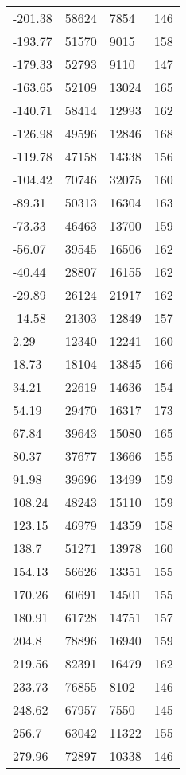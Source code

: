 \documentclass[11pt,wide]{mwart}
\begin{document}
\begin{longtable}{|l|l|l|l|}
        -201.38 & 58624 & 7854 & 146 \\
        -193.77 & 51570 & 9015 & 158 \\
        -179.33 & 52793 & 9110 & 147 \\
        -163.65 & 52109 & 13024 & 165 \\
        -140.71 & 58414 & 12993 & 162 \\
        -126.98 & 49596 & 12846 & 168 \\
        -119.78 & 47158 & 14338 & 156 \\
        -104.42 & 70746 & 32075 & 160 \\
         -89.31 & 50313 & 16304 & 163 \\
         -73.33 & 46463 & 13700 & 159 \\
         -56.07 & 39545 & 16506 & 162 \\
         -40.44 & 28807 & 16155 & 162 \\
         -29.89 & 26124 & 21917 & 162 \\
         -14.58 & 21303 & 12849 & 157 \\
           2.29 & 12340 & 12241 & 160 \\
          18.73 & 18104 & 13845 & 166 \\
          34.21 & 22619 & 14636 & 154 \\
          54.19 & 29470 & 16317 & 173 \\
          67.84 & 39643 & 15080 & 165 \\
          80.37 & 37677 & 13666 & 155 \\
          91.98 & 39696 & 13499 & 159 \\
         108.24 & 48243 & 15110 & 159 \\
         123.15 & 46979 & 14359 & 158 \\
          138.7 & 51271 & 13978 & 160 \\
         154.13 & 56626 & 13351 & 155 \\
         170.26 & 60691 & 14501 & 155 \\
         180.91 & 61728 & 14751 & 157 \\
          204.8 & 78896 & 16940 & 159 \\
         219.56 & 82391 & 16479 & 162 \\
         233.73 & 76855 & 8102 & 146 \\
         248.62 & 67957 & 7550 & 145 \\
          256.7 & 63042 & 11322 & 155 \\
         279.96 & 72897 & 10338 & 146 \\

\end{longtable}
\end{document}

